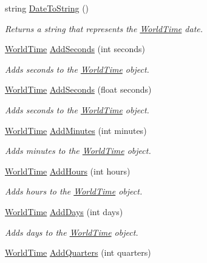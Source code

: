 \begin{DoxyCompactItemize}
string \hyperlink{struct_world_time_a5de3457e2d99193efe938c72ab9629b3}{Date\+To\+String} ()
\begin{DoxyCompactList}\small\item\em Returns a string that represents the \hyperlink{struct_world_time}{World\+Time} date. \end{DoxyCompactList}\item 
\hyperlink{struct_world_time}{World\+Time} \hyperlink{struct_world_time_a223f14f497e431c3c1ca47d83e81967b}{Add\+Seconds} (int seconds)
\begin{DoxyCompactList}\small\item\em Adds seconds to the \hyperlink{struct_world_time}{World\+Time} object. \end{DoxyCompactList}\item 
\hyperlink{struct_world_time}{World\+Time} \hyperlink{struct_world_time_a68c14abe7986ee983c6cbc6aeaff3764}{Add\+Seconds} (float seconds)
\begin{DoxyCompactList}\small\item\em Adds seconds to the \hyperlink{struct_world_time}{World\+Time} object. \end{DoxyCompactList}\item 
\hyperlink{struct_world_time}{World\+Time} \hyperlink{struct_world_time_a6300271c22e941397c17a076426c1b18}{Add\+Minutes} (int minutes)
\begin{DoxyCompactList}\small\item\em Adds minutes to the \hyperlink{struct_world_time}{World\+Time} object. \end{DoxyCompactList}\item 
\hyperlink{struct_world_time}{World\+Time} \hyperlink{struct_world_time_a633c5414a483c48a482cb1277b055deb}{Add\+Hours} (int hours)
\begin{DoxyCompactList}\small\item\em Adds hours to the \hyperlink{struct_world_time}{World\+Time} object. \end{DoxyCompactList}\item 
\hyperlink{struct_world_time}{World\+Time} \hyperlink{struct_world_time_a59a7039e46bb8c3956a1341ca4ef74c1}{Add\+Days} (int days)
\begin{DoxyCompactList}\small\item\em Adds days to the \hyperlink{struct_world_time}{World\+Time} object. \end{DoxyCompactList}\item 
\hyperlink{struct_world_time}{World\+Time} \hyperlink{struct_world_time_afaba01854023dde8f480312814c47a79}{Add\+Quarters} (int quarters)

\end{DoxyCompactItemize}
